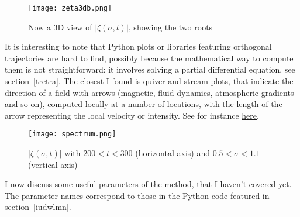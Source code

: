 \documentclass[oneside,10pt]{book}
\begin{document}
\begin{figure}%
\centering
\texttt{[image: zeta3db.png]} %
\caption{Now a 3D view of $|\zeta(\sigma,t)|$, showing the two roots}
\label{fig:zeta3d}
\end{figure}

It is interesting to note that Python plots or libraries featuring orthogonal trajectories are hard to find, possibly because the mathematical way to compute them is not straightforward: it involves solving a partial differential equation, see section~\ref{tretra}.  The closest I found is quiver and
 stream plots, that indicate the direction of a field with arrows (magnetic, fluid dynamics, atmospheric gradients and so on), computed locally at a number of locations, with the length of the arrow
 representing the local velocity or intensity. See for instance
 \href{https://problemsolvingwithpython.com/06-Plotting-with-Matplotlib/06.15-Quiver-and-Stream-Plots/}{here}.

\begin{figure}%
\centering
\texttt{[image: spectrum.png]} %
\caption{$|\zeta(\sigma,t)|$ with $200<t<300$ (horizontal axis) and $0.5 < \sigma < 1.1$ (vertical axis)}
\label{fig:spectrum}
\end{figure}

I now discuss some useful parameters of the method, that I haven't covered yet. The parameter names correspond  to those in the Python code featured in section~\ref{iudwlmn}. \vspace{1ex}
\end{document}
